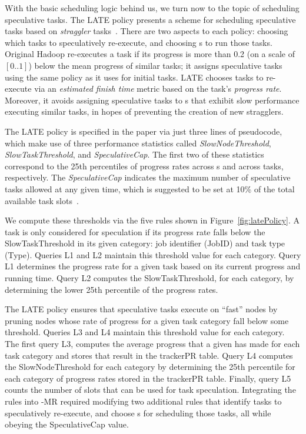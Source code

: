 With the basic scheduling logic behind us, we turn now to the topic of
scheduling speculative tasks. The LATE policy presents a scheme for 
scheduling speculative tasks based on {\em straggler} tasks~\cite{zaharia-late}.
There are two aspects to each policy:
choosing which tasks to speculatively re-execute, and choosing {\TT}s
to run those tasks.  Original Hadoop re-executes a task if its
progress is more than 0.2 (on a scale of $[0..1]$) below the mean
progress of similar tasks; it assigns speculative tasks using the same
policy as it uses for initial tasks. LATE chooses tasks to re-execute
via an {\em estimated finish time} metric based on the task's
\emph{progress rate}. Moreover, it avoids assigning speculative tasks
to {\TT}s that exhibit slow performance executing similar tasks, in
hopes of preventing the creation of new stragglers.

The LATE policy is specified in the paper via just three lines of pseudocode,
which make use of three performance statistics called {\em SlowNodeThreshold},
{\em SlowTaskThreshold}, and {\em SpeculativeCap}.  The first two of these
statistics correspond to the 25th percentiles of progress rates across {\TT}s
and across tasks, respectively.  The {\em SpeculativeCap} indicates the maximum
number of speculative tasks allowed at any given time, which is suggested to be
set at 10\% of the total available task slots~\cite{zaharia-late}.

We compute these thresholds via the five \OVERLOG rules shown in
Figure~\ref{fig:latePolicy}. A task is only considered for speculation if its progress rate falls 
below the SlowTaskThreshold in its given category: job identifier (JobID) and task type (Type).  
Queries L1 and L2 maintain this threshold value for each category. Query L1 determines the progress 
rate for a given task based on its current progress and running time. Query L2 computes the SlowTaskThreshold, 
for each category, by determining the lower 25th percentile of the progress rates. 

The LATE policy ensures that speculative tasks execute on ``fast'' nodes by pruning \TT 
nodes whose rate of progress for a given task category fall below some threshold. 
Queries L3 and L4 maintain this threshold value for each category. The first query L3, computes 
the average progress that a given \TT has made for each task category and stores that result in 
the trackerPR table. Query L4 computes the SlowNodeThreshold for each category by determining the 25th 
percentile for each category of progress rates stored in the trackerPR table. Finally, query L5 counts the number of
slots that can be used for task speculation. Integrating the rules into \BOOM-MR required modifying two 
additional \OVERLOG rules that identify tasks to speculatively re-execute, and choose {\TT}s for scheduling those
tasks, all while obeying the SpeculativeCap value.

